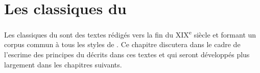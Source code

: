 \chapter{Les classiques du \Taiji{}}\label{ch:classics}

Les classiques du \Taiji{} sont des textes rédigés vers la fin du XIX\textsuperscript{e} siècle et formant un corpus commun à tous les styles de \Taijiquan{}.
Ce chapitre discutera dans le cadre de l'escrime des principes du \Taiji{} décrits dans ces textes et qui seront développés plus largement dans les chapitres suivants.